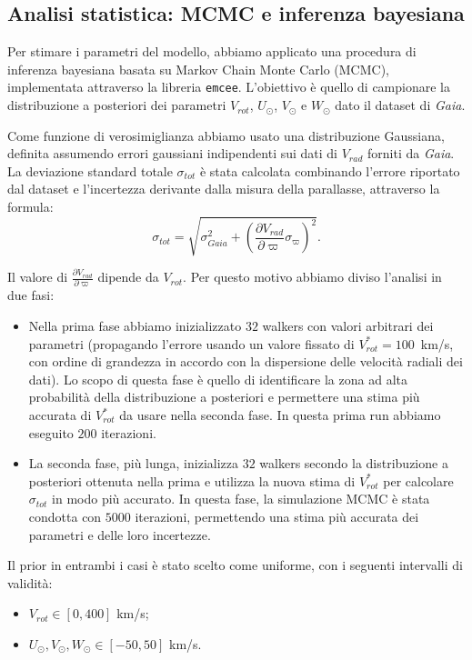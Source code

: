\documentclass[twocolumn]{article}
\begin{document}
\subsection{Analisi statistica: MCMC e inferenza bayesiana}
Per stimare i parametri del modello, abbiamo applicato una procedura di inferenza bayesiana basata su Markov Chain Monte Carlo (MCMC), implementata attraverso la libreria \texttt{emcee}. L'obiettivo è quello di campionare la distribuzione a posteriori dei parametri $V_{rot}$, $U_\odot$, $V_\odot$ e $W_\odot$ dato il dataset di {\it Gaia}.

Come funzione di verosimiglianza abbiamo usato una distribuzione Gaussiana, definita assumendo errori gaussiani indipendenti sui dati di $V_{rad}$ forniti da {\it Gaia}. La deviazione standard totale $\sigma_{tot}$ è stata calcolata combinando l'errore riportato dal dataset e l'incertezza derivante dalla misura della parallasse, attraverso la formula:
\[ \sigma_{tot} = \sqrt{\sigma_{Gaia}^2 + \left( \frac{\partial V_{rad}}{\partial \varpi} \sigma_\varpi \right)^2}. \]


Il valore di $\frac{\partial V_{rad}}{\partial \varpi}$ dipende da $V_{rot}$. Per questo motivo abbiamo diviso l'analisi in due fasi:
\begin{itemize}
    \item Nella prima fase abbiamo inizializzato $32$ walkers con valori arbitrari dei parametri (propagando l'errore usando un valore fissato di $V^*_{rot} = 100$~km/s, con ordine di grandezza in accordo con la dispersione delle velocità radiali dei dati). Lo scopo di questa fase è quello di identificare la zona ad alta probabilità della distribuzione a posteriori e permettere una stima più accurata di $V^*_{rot}$ da usare nella seconda fase. In questa prima run abbiamo eseguito $200$ iterazioni.
    \item La seconda fase, più lunga, inizializza $32$ walkers  secondo la distribuzione a posteriori ottenuta nella prima e utilizza la nuova stima di $V^*_{rot}$ per calcolare $\sigma_{tot}$ in modo più accurato. In questa fase, la simulazione MCMC è stata condotta con $5000$ iterazioni, permettendo una stima più accurata dei parametri e delle loro incertezze.
\end{itemize}

Il prior in entrambi i casi è stato scelto come uniforme, con i seguenti intervalli di validità:
\begin{itemize}
    \item $V_{rot} \in [0, 400]$ km/s;
    \item $U_\odot, V_\odot, W_\odot \in [-50, 50]$ km/s.
\end{itemize}
\end{document}
